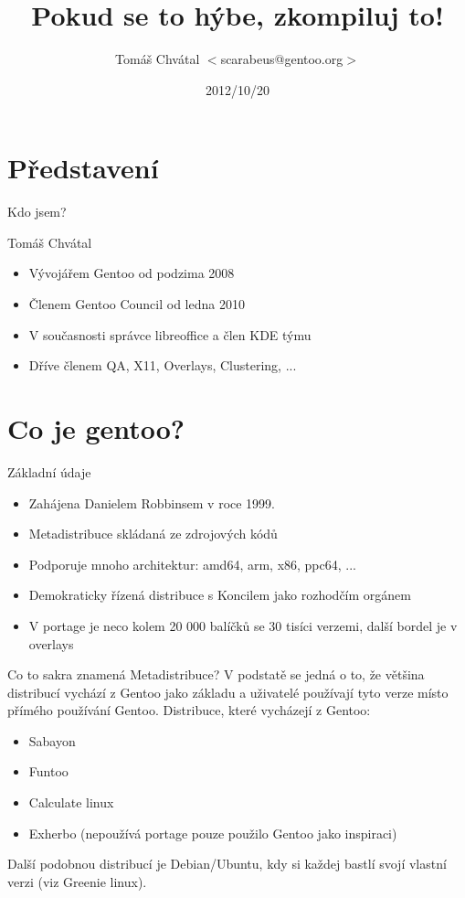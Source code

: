 \documentclass{beamer}
\title{Pokud se to hýbe, zkompiluj to!}
\author[Tomáš Chvátal]{Tomáš Chvátal $<$scarabeus@gentoo.org$>$}
\date{2012/10/20}
\begin{document}
\frame{\titlepage}
\section{Představení}
\begin{frame}{Kdo jsem?}
	\begin{center}Tomáš Chvátal\end{center}
	\begin{itemize}
		\item Vývojářem Gentoo od podzima 2008
		\item Členem Gentoo Council od ledna 2010
		\item V současnosti správce libreoffice a člen KDE týmu
		\item Dříve členem QA, X11, Overlays, Clustering, ...
	\end{itemize}
\end{frame}
\section{Co je gentoo?}

\begin{frame}{Základní údaje}
	\begin{itemize}
		\item Zahájena Danielem Robbinsem v roce 1999.
		\item Metadistribuce skládaná ze zdrojových kódů
		\item Podporuje mnoho architektur: amd64, arm, x86, ppc64, ...
		\item Demokraticky řízená distribuce s Koncilem jako rozhodčím orgánem
		\item V portage je neco kolem 20 000 balíčků se 30 tisíci verzemi, další bordel je v overlays
	\end{itemize}
\end{frame}

\begin{frame}{Co to sakra znamená Metadistribuce?}
	V podstatě se jedná o to, že většina distribucí vychází z Gentoo jako základu a uživatelé používají tyto verze místo přímého používání Gentoo.
	Distribuce, které vycházejí z Gentoo:
	\begin{itemize}
		\item Sabayon
		\item Funtoo
		\item Calculate linux
		\item Exherbo (nepoužívá portage pouze použilo Gentoo jako inspiraci)
	\end{itemize}
	Další podobnou distribucí je Debian/Ubuntu, kdy si každej  bastlí svojí vlastní verzi (viz Greenie linux).
\end{frame}
\end{document}

